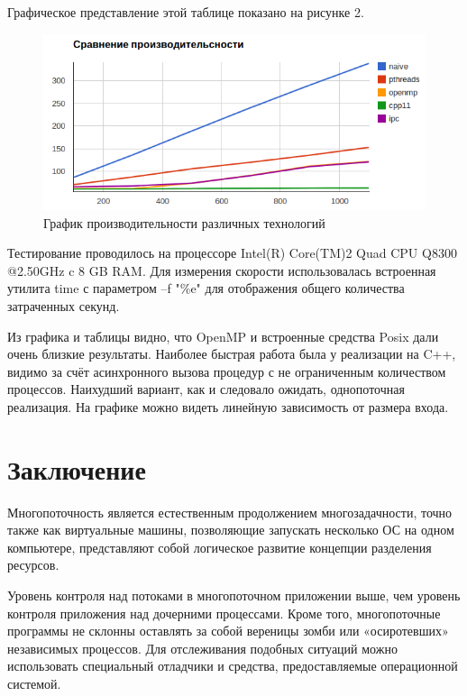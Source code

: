 \documentclass[a4paper, 12pt]{report}		%
\begin{document}
Графическое представление этой таблице показано на рисунке 2.

\begin{figure}[h!]
\centering
\includegraphics[scale=0.8]{res/perfomance}
\caption{График производительности различных технологий}
\end{figure}

Тестирование проводилось на процессоре Intel(R) Core(TM)2 Quad CPU Q8300 @2.50GHz c 8 GB RAM. Для измерения скорости использовалась встроенная утилита time с параметром --f "\%e" для отображения общего количества затраченных секунд.

Из графика и таблицы видно, что OpenMP и встроенные средства Posix дали очень близкие результаты. Наиболее быстрая работа была у реализации на C++, видимо за счёт асинхронного вызова процедур с не ограниченным количеством процессов. Наихудший вариант, как и следовало ожидать, однопоточная реализация. На графике можно видеть линейную зависимость от размера входа. 


\chapter*{Заключение}

Многопоточность является естественным продолжением многозадачности, точно также как виртуальные машины, позволяющие запускать несколько ОС на одном компьютере, представляют собой логическое развитие концепции разделения ресурсов.
\vspace{1em}

Уровень контроля над потоками в многопоточном приложении выше, чем уровень контроля приложения над дочерними процессами. Кроме того, многопоточные программы не склонны оставлять за собой вереницы зомби или «осиротевших» независимых процессов. Для отслеживания подобных ситуаций можно использовать специальный отладчики и средства, предоставляемые операционной системой.
\vspace{1em}
\end{document}
